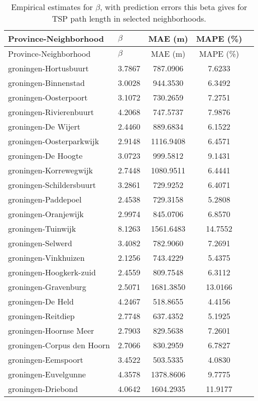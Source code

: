 \begin{longtable}{llccc}
\caption{Empirical estimates for $\beta$, with prediction errors this beta gives for TSP path length in selected neighborhoods.} \label{tab:results}\\
\hline
Province-Neighborhood & $\beta$ & MAE (m) & MAPE (\%) \\
\hline
\endfirsthead
\hline
Province-Neighborhood & $\beta$ & MAE (m) & MAPE (\%) \\
\hline
\endhead
groningen-Hortusbuurt & 3.7867 & 787.0906 & 7.6233 \\
groningen-Binnenstad & 3.0028 & 944.3530 & 6.3492 \\
groningen-Oosterpoort & 3.1072 & 730.2659 & 7.2751 \\
groningen-Rivierenbuurt & 4.2068 & 747.5737 & 7.9876 \\
groningen-De Wijert & 2.4460 & 889.6834 & 6.1522 \\
groningen-Oosterparkwijk & 2.9148 & 1116.9408 & 6.4571 \\
groningen-De Hoogte & 3.0723 & 999.5812 & 9.1431 \\
groningen-Korrewegwijk & 2.7448 & 1080.9511 & 6.4441 \\
groningen-Schildersbuurt & 3.2861 & 729.9252 & 6.4071 \\
groningen-Paddepoel & 2.4538 & 729.3158 & 5.2808 \\
groningen-Oranjewijk & 2.9974 & 845.0706 & 6.8570 \\
groningen-Tuinwijk & 8.1263 & 1561.6483 & 14.7552 \\
groningen-Selwerd & 3.4082 & 782.9060 & 7.2691 \\
groningen-Vinkhuizen & 2.1256 & 743.4229 & 5.4375 \\
groningen-Hoogkerk-zuid & 2.4559 & 809.7548 & 6.3112 \\
groningen-Gravenburg & 2.5071 & 1681.3850 & 13.0166 \\
groningen-De Held & 4.2467 & 518.8655 & 4.4156 \\
groningen-Reitdiep & 2.7748 & 637.4352 & 5.1925 \\
groningen-Hoornse Meer & 2.7903 & 829.5638 & 7.2601 \\
groningen-Corpus den Hoorn & 2.7066 & 830.2959 & 6.7827 \\
groningen-Eemspoort & 3.4522 & 503.5335 & 4.0830 \\
groningen-Euvelgunne & 4.3578 & 1378.8606 & 9.7775 \\
groningen-Driebond & 4.0642 & 1604.2935 & 11.9177 \\

\end{longtable}

